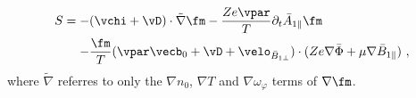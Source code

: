\begin{gather}
	\begin{aligned}
		S = -& (\vchi + \vD) \cdot \tilde{\nabla} \fm - \frac{Z e \vpar}{T} \partial_t \bar{A}_{1\parallel} \fm \\
		    -& \frac{\fm}{T} (\vpar \vecb_0 + \vD + \velo_{\bar{B}_{1\perp}}) \cdot (Z e \nabla \bar{\Phi} + \mu \nabla \bar{B}_{1\parallel})~,
	\end{aligned}
	\label{eq:sourceTerm}
\end{gather}
where $\tilde{\nabla}$ referres to only the $\nabla n_0$, $\nabla T$ and $\nabla \omega_\varphi$ terms of $\nabla \fm$. \bigskip

